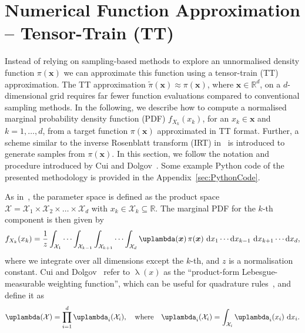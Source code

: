 \section{Numerical Function Approximation -- Tensor-Train (TT)}
\label{sec:tensortrain}
Instead of relying on sampling-based methods to explore an unnormalised density function $\pi(\bm{x})$ we can approximate this function using a tensor-train (TT) approximation.
The TT approximation $\tilde{\pi}(\bm{x}) \approx \pi(\bm{x})$, where $\bm{x} \in \mathbb{R}^d$, on a $d$-dimensional grid requires far fewer function evaluations compared to conventional sampling methods.
In the following, we describe how to compute a normalised marginal probability density function (PDF) $f_{X_k}(x_k)$, for an $x_k \in \bm{x}$ and $k = 1, \dots,d$, from a target function $\pi(\bm{x})$ approximated in TT format.
Further, a scheme similar to the inverse Rosenblatt transform (IRT) in~\cite{dolgov2020approximation} is introduced to generate samples from $\pi(\bm{x})$.
In this section, we follow the notation and procedure introduced by Cui and Dolgov~\cite{cui2022deep}.
Some example Python code of the presented methodology is provided in the Appendix~\ref{sec:PythonCode}.

As in~\cite{cui2022deep}, the parameter space is defined as the product space $\mathcal{X} = \mathcal{X}_1 \times \mathcal{X}_2 \times \dots \times \mathcal{X}_d$ with $ x_k \in \mathcal{X}_k \subseteq \mathbb{R}$.
The marginal PDF for the $k$-th component is then given by
\begin{align}
	f_{X_k}(x_k) = \frac{1}{z} \int_{\mathcal{X}_1} \cdots \int_{\mathcal{X}_{k-1}} \int_{\mathcal{X}_{k+1}} \cdots  \int_{\mathcal{X}_d} \uplambda(\bm{x}) \, \pi(\bm{x}) \, \diff x_1 \cdots \diff x_{k-1} \, \diff x_{k+1} \cdots \diff x_d, \label{eq:margInt}
\end{align}
where we integrate over all dimensions except the $k$-th, and $z$ is a normalisation constant.
Cui and Dolgov~\cite{cui2022deep} refer to $\uplambda(x)$ as the ``product-form Lebesgue-measurable weighting function'', which can be useful for quadrature rules~\cite{davis2007methods}, and define it as
\begin{align}
	\uplambda(\mathcal{X}) = \prod_{i = 1}^{d} \uplambda_i(\mathcal{X}_i), \quad \text{where} \quad \uplambda_i(\mathcal{X}_i) = \int_{\mathcal{X}_i} \uplambda_i(x_i) \, \diff x_i. \label{eq:lebesgueWeight}
\end{align}

